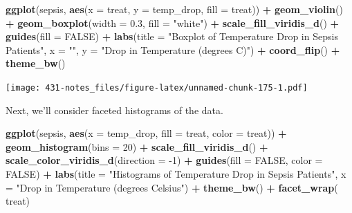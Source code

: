 \documentclass[
]{book}
\newenvironment{Shaded}{\begin{snugshade}}{\end{snugshade}}
\newcommand{\DataTypeTok}[1]{\textcolor[rgb]{0.13,0.29,0.53}{#1}}
\newcommand{\DecValTok}[1]{\textcolor[rgb]{0.00,0.00,0.81}{#1}}
\newcommand{\FloatTok}[1]{\textcolor[rgb]{0.00,0.00,0.81}{#1}}
\newcommand{\KeywordTok}[1]{\textcolor[rgb]{0.13,0.29,0.53}{\textbf{#1}}}
\newcommand{\NormalTok}[1]{#1}
\newcommand{\OperatorTok}[1]{\textcolor[rgb]{0.81,0.36,0.00}{\textbf{#1}}}
\newcommand{\OtherTok}[1]{\textcolor[rgb]{0.56,0.35,0.01}{#1}}
\newcommand{\StringTok}[1]{\textcolor[rgb]{0.31,0.60,0.02}{#1}}
\begin{document}
\begin{Shaded}
\begin{Highlighting}[]
\KeywordTok{ggplot}\NormalTok{(sepsis, }\KeywordTok{aes}\NormalTok{(}\DataTypeTok{x =}\NormalTok{ treat, }\DataTypeTok{y =}\NormalTok{ temp_drop, }\DataTypeTok{fill =}\NormalTok{ treat)) }\OperatorTok{+}
\StringTok{    }\KeywordTok{geom_violin}\NormalTok{() }\OperatorTok{+}
\StringTok{    }\KeywordTok{geom_boxplot}\NormalTok{(}\DataTypeTok{width =} \FloatTok{0.3}\NormalTok{, }\DataTypeTok{fill =} \StringTok{"white"}\NormalTok{) }\OperatorTok{+}
\StringTok{    }\KeywordTok{scale_fill_viridis_d}\NormalTok{() }\OperatorTok{+}
\StringTok{    }\KeywordTok{guides}\NormalTok{(}\DataTypeTok{fill =} \OtherTok{FALSE}\NormalTok{) }\OperatorTok{+}\StringTok{ }
\StringTok{    }\KeywordTok{labs}\NormalTok{(}\DataTypeTok{title =} \StringTok{"Boxplot of Temperature Drop in Sepsis Patients"}\NormalTok{,}
         \DataTypeTok{x =} \StringTok{""}\NormalTok{, }\DataTypeTok{y =} \StringTok{"Drop in Temperature (degrees C)"}\NormalTok{) }\OperatorTok{+}\StringTok{ }
\StringTok{    }\KeywordTok{coord_flip}\NormalTok{() }\OperatorTok{+}
\StringTok{    }\KeywordTok{theme_bw}\NormalTok{()}
\end{Highlighting}
\end{Shaded}

\texttt{[image: 431-notes\_files/figure-latex/unnamed-chunk-175-1.pdf]}

Next, we'll consider faceted histograms of the data.

\begin{Shaded}
\begin{Highlighting}[]
\KeywordTok{ggplot}\NormalTok{(sepsis, }\KeywordTok{aes}\NormalTok{(}\DataTypeTok{x =}\NormalTok{ temp_drop, }\DataTypeTok{fill =}\NormalTok{ treat, }\DataTypeTok{color =}\NormalTok{ treat)) }\OperatorTok{+}
\StringTok{    }\KeywordTok{geom_histogram}\NormalTok{(}\DataTypeTok{bins =} \DecValTok{20}\NormalTok{) }\OperatorTok{+}
\StringTok{    }\KeywordTok{scale_fill_viridis_d}\NormalTok{() }\OperatorTok{+}
\StringTok{    }\KeywordTok{scale_color_viridis_d}\NormalTok{(}\DataTypeTok{direction =} \DecValTok{-1}\NormalTok{) }\OperatorTok{+}
\StringTok{    }\KeywordTok{guides}\NormalTok{(}\DataTypeTok{fill =} \OtherTok{FALSE}\NormalTok{, }\DataTypeTok{color =} \OtherTok{FALSE}\NormalTok{) }\OperatorTok{+}\StringTok{ }
\StringTok{    }\KeywordTok{labs}\NormalTok{(}\DataTypeTok{title =} \StringTok{"Histograms of Temperature Drop in Sepsis Patients"}\NormalTok{,}
         \DataTypeTok{x =} \StringTok{"Drop in Temperature (degrees Celsius"}\NormalTok{) }\OperatorTok{+}
\StringTok{    }\KeywordTok{theme_bw}\NormalTok{() }\OperatorTok{+}
\StringTok{    }\KeywordTok{facet_wrap}\NormalTok{(}\OperatorTok{~}\StringTok{ }\NormalTok{treat)}
\end{Highlighting}
\end{Shaded}
\end{document}
